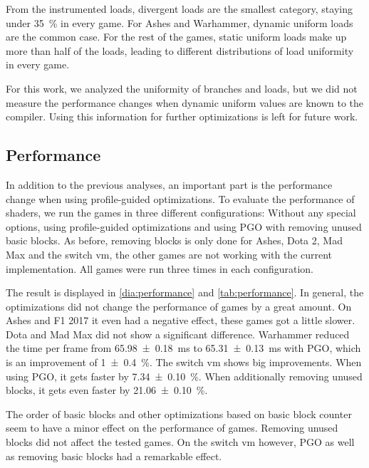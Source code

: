 From the instrumented loads, divergent loads are the smallest category, staying under \SI{35}{\percent} in every game.
For Ashes and Warhammer, dynamic uniform loads are the common case. For the rest of the games, static uniform loads make up more than half of the loads, leading to different distributions of load uniformity in every game.

For this work, we analyzed the uniformity of branches and loads, but we did not measure the performance changes when dynamic uniform values are known to the compiler.
Using this information for further optimizations is left for future work.

\subsection{Performance}
\label{sub:eval_perf}
In addition to the previous analyses, an important part is the performance change when using profile-guided optimizations.
To evaluate the performance of shaders, we run the games in three different configurations: Without any special options, using profile-guided optimizations and using PGO with removing unused basic blocks.
As before, removing blocks is only done for Ashes, Dota 2, Mad Max and the switch vm, the other games are not working with the current implementation.
All games were run three times in each configuration.


\begin{table}
	\centering
	\label{tab:performance}
\end{table}

The result is displayed in \cref{dia:performance} and \cref{tab:performance}.
In general, the optimizations did not change the performance of games by a great amount.
On Ashes and F1 2017 it even had a negative effect, these games got a little slower.
Dota and Mad Max did not show a significant difference.
Warhammer reduced the time per frame from \SI{65.98 \pm 0.18}{\milli\second} to \SI{65.31 \pm 0.13}{\milli\second} with PGO, which is an improvement of \SI{1 \pm 0.4}{\percent}.
The switch vm shows big improvements. When using PGO, it gets faster by \SI{7.34 \pm 0.10}{\percent}.
When additionally removing unused blocks, it gets even faster by \SI{21.06 \pm 0.10}{\percent}.

The order of basic blocks and other optimizations based on basic block counter seem to have a minor effect on the performance of games.
Removing unused blocks did not affect the tested games.
On the switch vm however, PGO as well as removing basic blocks had a remarkable effect.

